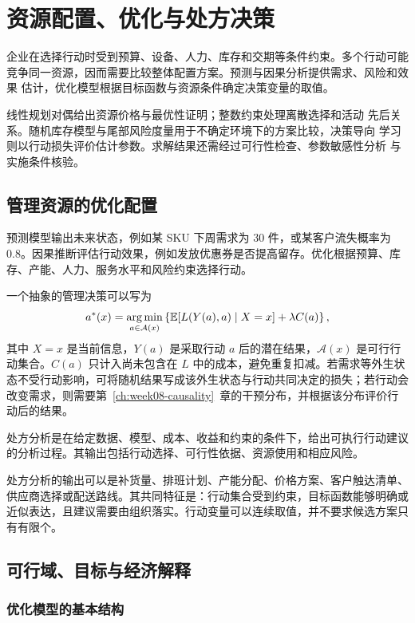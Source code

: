 \chapter{资源配置、优化与处方决策}
\label{ch:week09-optimization}

企业在选择行动时受到预算、设备、人力、库存和交期等条件约束。多个行动可能
竞争同一资源，因而需要比较整体配置方案。预测与因果分析提供需求、风险和效果
估计，优化模型根据目标函数与资源条件确定决策变量的取值。

线性规划对偶给出资源价格与最优性证明；整数约束处理离散选择和活动
先后关系。随机库存模型与尾部风险度量用于不确定环境下的方案比较，决策导向
学习则以行动损失评价估计参数。求解结果还需经过可行性检查、参数敏感性分析
与实施条件核验。

\section{管理资源的优化配置}

预测模型输出未来状态，例如某 SKU 下周需求为 30 件，或某客户流失概率为 0.8。因果推断评估行动效果，例如发放优惠券是否提高留存。优化根据预算、库存、产能、人力、服务水平和风险约束选择行动。

一个抽象的管理决策可以写为
\[
  a^*(x)
  =
  \operatorname*{arg\,min}_{a\in\mathcal A(x)}
  \left\{\mathbb E[L(Y(a),a)\mid X=x]+\lambda C(a)\right\},
\]
其中 \(X=x\) 是当前信息，\(Y(a)\) 是采取行动 \(a\) 后的潜在结果，\(\mathcal A(x)\) 是可行行动集合。\(C(a)\) 只计入尚未包含在 \(L\) 中的成本，避免重复扣减。若需求等外生状态不受行动影响，可将随机结果写成该外生状态与行动共同决定的损失；若行动会改变需求，则需要第~\ref{ch:week08-causality}~章的干预分布，并根据该分布评价行动后的结果。

\begin{definition}[处方分析]
处方分析是在给定数据、模型、成本、收益和约束的条件下，给出可执行行动建议的分析过程。其输出包括行动选择、可行性依据、资源使用和相应风险。
\end{definition}

处方分析的输出可以是补货量、排班计划、产能分配、价格方案、客户触达清单、供应商选择或配送路线。其共同特征是：行动集合受到约束，目标函数能够明确或近似表达，且建议需要由组织落实。行动变量可以连续取值，并不要求候选方案只有有限个。

\section{可行域、目标与经济解释}
\subsection{优化模型的基本结构}

